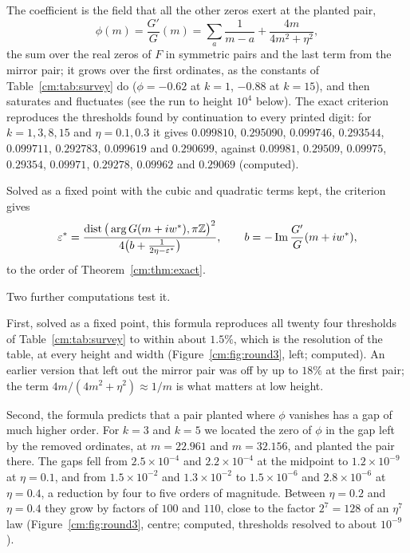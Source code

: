 The coefficient is the field that all the other zeros exert at the planted pair,
\[
\phi(m)=\frac{G'}G(m)=\sum_a\frac1{m-a}+\frac{4m}{4m^2+\eta^2},
\]
the sum over the real zeros of $F$ in symmetric pairs and the last term from the mirror pair; it grows over the first ordinates, as the constants of Table~\ref{cm:tab:survey} do ($\phi=-0.62$ at $k=1$, $-0.88$ at $k=15$), and then saturates and fluctuates (see the run to height $10^4$ below). The exact criterion reproduces the thresholds found by continuation to every printed digit: for $k=1,3,8,15$ and $\eta=0.1,0.3$ it gives $0.099810$, $0.295090$, $0.099746$, $0.293544$, $0.099711$, $0.292783$, $0.099619$ and $0.290699$, against $0.09981$, $0.29509$, $0.09975$, $0.29354$, $0.09971$, $0.29278$, $0.09962$ and $0.29069$ (computed).

\begin{remark}[heuristic]\label{cm:prop:gap}
Solved as a fixed point with the cubic and quadratic terms kept, the criterion gives
\[
\varepsilon^*=\frac{\operatorname{dist}\big(\arg G(m+iw^*),\pi\mathbb Z\big)^2}{4\big(b+\frac1{2\eta-\varepsilon^*}\big)},\qquad b=-\operatorname{Im}\frac{G'}G(m+iw^*),
\]
to the order of Theorem~\ref{cm:thm:exact}.
\end{remark}

Two further computations test it.

First, solved as a fixed point, this formula reproduces all twenty four thresholds of Table~\ref{cm:tab:survey} to within about $1.5\%$, which is the resolution of the table, at every height and width (Figure~\ref{cm:fig:round3}, left; computed). An earlier version that left out the mirror pair was off by up to $18\%$ at the first pair; the term $4m/(4m^2+\eta^2)\approx1/m$ is what matters at low height.

Second, the formula predicts that a pair planted where $\phi$ vanishes has a gap of much higher order. For $k=3$ and $k=5$ we located the zero of $\phi$ in the gap left by the removed ordinates, at $m=22.961$ and $m=32.156$, and planted the pair there. The gaps fell from $2.5\times10^{-4}$ and $2.2\times10^{-4}$ at the midpoint to $1.2\times10^{-9}$ at $\eta=0.1$, and from $1.5\times10^{-2}$ and $1.3\times10^{-2}$ to $1.5\times10^{-6}$ and $2.8\times10^{-6}$ at $\eta=0.4$, a reduction by four to five orders of magnitude. Between $\eta=0.2$ and $\eta=0.4$ they grow by factors of $100$ and $110$, close to the factor $2^7=128$ of an $\eta^7$ law (Figure~\ref{cm:fig:round3}, centre; computed, thresholds resolved to about $10^{-9}$).

